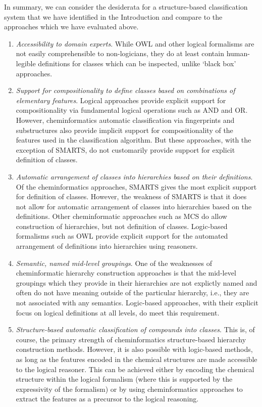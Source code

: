 \documentclass[10pt]{bmc_article}
\newenvironment{bmcformat}{\baselineskip20pt\sloppy\setboolean{publ}{false}}{\baselineskip20pt\sloppy}
\begin{document}
\begin{bmcformat}
In summary, we can consider the desiderata for a structure-based classification system that we have identified in the Introduction and compare to the approaches which we have evaluated above. 
\begin{enumerate}
	\item \textit{Accessibility to domain experts}. While OWL and other logical formalisms are not easily comprehensible to non-logicians, they do at least contain human-legible definitions for classes which can be inspected, unlike `black box' approaches. 
  \item \textit{Support for compositionality to define classes based on combinations of elementary features}. Logical approaches provide explicit support for compositionality via fundamental logical operations such as AND and OR. However, cheminformatics automatic classification via fingerprints and substructures also provide implicit support for compositionality of the features used in the classification algorithm. But these approaches, with the exception of SMARTS, do not customarily provide support for explicit definition of classes. 
	\item \textit{Automatic arrangement of classes into hierarchies based on their definitions}. Of the cheminformatics approaches, SMARTS gives the most explicit support for definition of classes. However, the weakness of SMARTS is that it does not allow for automatic arrangement of classes into hierarchies based on the definitions. Other cheminformatic approaches such as MCS do allow construction of hierarchies, but not definition of classes. Logic-based formalisms such as OWL provide explicit support for the automated arrangement of definitions into hierarchies using reasoners. 
	\item \textit{Semantic, named mid-level groupings}. One of the weaknesses of cheminformatic hierarchy construction approaches is that the mid-level groupings which they provide in their hierarchies are not explictly named and often do not have meaning outside of the particular hierarchy, i.e., they are not associated with any semantics. Logic-based approaches, with their explicit focus on logical definitions at all levels, do meet this requirement. 
	\item \textit{Structure-based automatic classification of compounds into classes}. This is, of course, the primary strength of cheminformatics structure-based hierarchy construction methods. However, it is also possible with logic-based methods, as long as the features encoded in the chemical structures are made accessible to the logical reasoner. This can be achieved either by encoding the chemical structure within the logical formalism (where this is supported by the expressivity of the formalism) or by using cheminformatics approaches to extract the features as a precursor to the logical reasoning. 
\end{enumerate}



\end{bmcformat}
\end{document}
